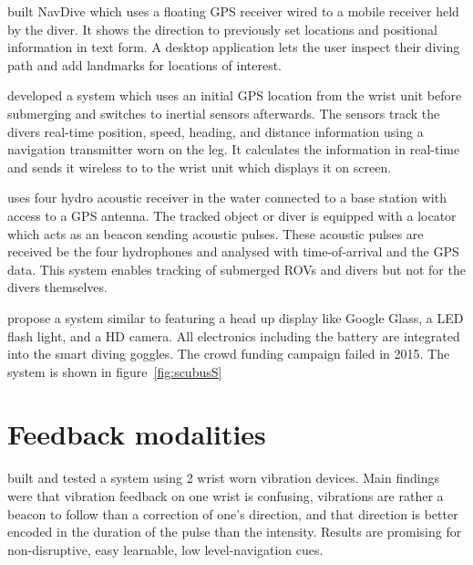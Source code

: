 \cite{navdive} built NavDive which uses a floating GPS receiver wired to a mobile receiver held by the diver. 
It shows the direction to previously set locations and positional information in text form. 
A desktop application lets the user inspect their diving path and add landmarks for locations of interest.

\cite{ariadna} developed a system which uses an initial GPS location from the wrist unit before submerging and switches to  inertial sensors afterwards.
The sensors track the divers real-time position, speed, heading, and distance information using a navigation transmitter worn on the leg.
It calculates the information in real-time and sends it wireless to to the wrist unit which displays it on screen.

\cite{waterlinked} uses four hydro acoustic receiver in the water connected to a base station with access to a GPS antenna. 
The tracked object or diver is equipped with a locator which acts as an beacon sending acoustic pulses. 
These acoustic pulses are received be the four hydrophones and analysed with time-of-arrival and the GPS data. This system enables tracking of submerged ROVs and divers but not for the divers themselves.


\cite{scubus} propose a system similar to featuring a head up display like Google Glass, a LED flash light, and a HD camera. 
All electronics including the battery are integrated into the smart diving goggles.
The crowd funding campaign failed in 2015.
The system is shown in figure~\ref{fig:scubusS} 

\section{Feedback modalities}

\cite{bosman} built and tested a system using 2 wrist worn vibration devices.
Main findings were that vibration feedback on one wrist is confusing, vibrations are rather a beacon to follow than a correction of one's direction, and that direction is better encoded in the duration of the pulse than the intensity.
Results are promising for non-disruptive, easy learnable, low level-navigation cues.

